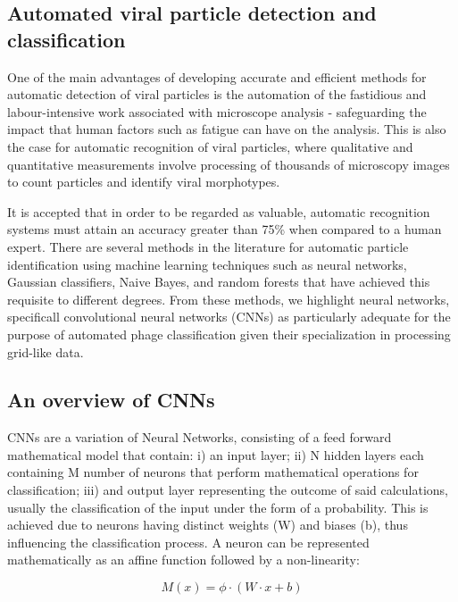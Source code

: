 \documentclass[runningheads]{llncs}
\begin{document}
\subsection{Automated viral particle detection and classification}

One of the main advantages of developing accurate and efficient methods for automatic detection of viral particles is the automation of the fastidious and labour-intensive work associated with microscope analysis - safeguarding the impact that human factors such as fatigue can have on the analysis.  \cite{glaeser2004}  This is also the case for automatic recognition of viral particles, where qualitative and quantitative measurements involve processing of thousands of microscopy images to count particles and identify viral morphotypes. \cite{glaeser2004,gelzinis2015}

It is accepted that in order to be regarded as valuable, automatic recognition systems must attain an accuracy greater than 75\% when compared to a human expert. \cite{glaeser2004} There are several methods in the literature for automatic particle identification using machine learning techniques  such as neural networks, Gaussian classifiers, Naive Bayes, and random forests that have achieved this requisite to different degrees. \cite{gelzinis2015,ogura2004,sorzano2009,castanon2007} From these methods, we highlight neural networks, specificall convolutional neural networks (CNNs) as particularly adequate for the purpose of automated phage classification given their specialization in processing grid-like data. 

\subsection{An overview of CNNs}

CNNs are a variation of Neural Networks, consisting of a feed forward mathematical model that contain: i) an input layer; ii) N hidden layers each containing M number of neurons that perform mathematical operations for classification; iii) and output layer representing the outcome of said calculations, usually the classification of the input under the form of a probability. This is achieved due to neurons having distinct weights (W) and biases (b), thus influencing the classification process. \cite{teuwen2020} A neuron can be represented mathematically as an affine function followed by a non-linearity: 

\begin{equation} \label{eq1}
    M(x) = \phi \cdot (W \cdot x + b)
\end{equation}
\end{document}
